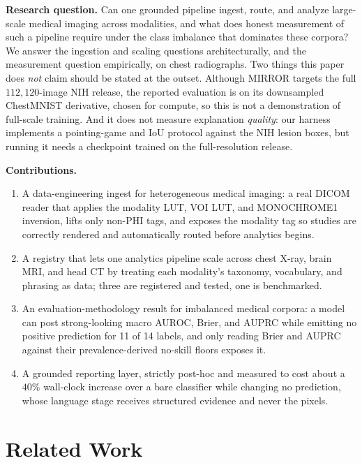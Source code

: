 \documentclass[conference]{IEEEtran}
\newcommand{\rih}[1]{\textbf{#1}\enspace\ignorespaces}
\begin{document}
\rih{Research question.} Can one grounded pipeline ingest, route, and analyze
large-scale medical imaging across modalities, and what does honest measurement of
such a pipeline require under the class imbalance that dominates these corpora? We
answer the ingestion and scaling questions architecturally, and the measurement
question empirically, on chest radiographs. Two things this paper does \emph{not}
claim should be stated at the outset. Although MIRROR targets the full
$112{,}120$-image NIH release, the reported evaluation is on its downsampled
ChestMNIST derivative, chosen for compute, so this is not a demonstration of
full-scale training. And it does not measure explanation \emph{quality}: our harness
implements a pointing-game and IoU protocol against the NIH lesion boxes, but running
it needs a checkpoint trained on the full-resolution release.

\rih{Contributions.}
\begin{enumerate}[leftmargin=1.3em,itemsep=1pt,topsep=2pt]
  \item A data-engineering ingest for heterogeneous medical imaging: a real DICOM
  reader that applies the modality LUT, VOI LUT, and MONOCHROME1 inversion, lifts
  only non-PHI tags, and exposes the modality tag so studies are correctly rendered
  and automatically routed before analytics begins.
  \item A registry that lets one analytics pipeline scale across chest X-ray, brain
  MRI, and head CT by treating each modality's taxonomy, vocabulary, and phrasing as
  data; three are registered and tested, one is benchmarked.
  \item An evaluation-methodology result for imbalanced medical corpora: a model can
  post strong-looking macro AUROC, Brier, and AUPRC while emitting no positive
  prediction for 11 of 14 labels, and only reading Brier and AUPRC against their
  prevalence-derived no-skill floors exposes it.
  \item A grounded reporting layer, strictly post-hoc and measured to cost about a
  $40\%$ wall-clock increase over a bare classifier while changing no prediction,
  whose language stage receives structured evidence and never the pixels.
\end{enumerate}

\section{Related Work}
\label{sec:litreview}
\end{document}
